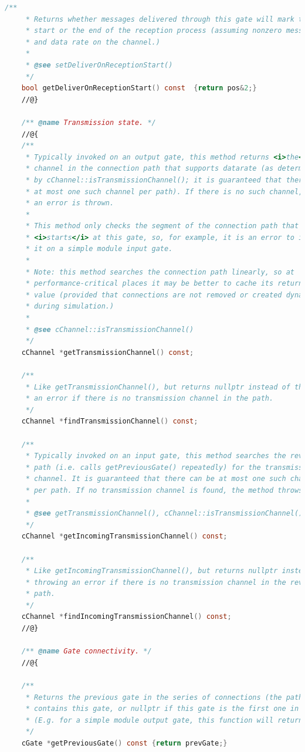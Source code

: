 \begin{lstlisting}[language=c]
    /**
     * Returns whether messages delivered through this gate will mark the
     * start or the end of the reception process (assuming nonzero message length
     * and data rate on the channel.)
     *
     * @see setDeliverOnReceptionStart()
     */
    bool getDeliverOnReceptionStart() const  {return pos&2;}
    //@}

    /** @name Transmission state. */
    //@{
    /**
     * Typically invoked on an output gate, this method returns <i>the</i>
     * channel in the connection path that supports datarate (as determined
     * by cChannel::isTransmissionChannel(); it is guaranteed that there can be
     * at most one such channel per path). If there is no such channel,
     * an error is thrown.
     *
     * This method only checks the segment of the connection path that
     * <i>starts</i> at this gate, so, for example, it is an error to invoke
     * it on a simple module input gate.
     *
     * Note: this method searches the connection path linearly, so at
     * performance-critical places it may be better to cache its return
     * value (provided that connections are not removed or created dynamically
     * during simulation.)
     *
     * @see cChannel::isTransmissionChannel()
     */
    cChannel *getTransmissionChannel() const;

    /**
     * Like getTransmissionChannel(), but returns nullptr instead of throwing
     * an error if there is no transmission channel in the path.
     */
    cChannel *findTransmissionChannel() const;

    /**
     * Typically invoked on an input gate, this method searches the reverse
     * path (i.e. calls getPreviousGate() repeatedly) for the transmission
     * channel. It is guaranteed that there can be at most one such channel
     * per path. If no transmission channel is found, the method throws an error.
     *
     * @see getTransmissionChannel(), cChannel::isTransmissionChannel()
     */
    cChannel *getIncomingTransmissionChannel() const;

    /**
     * Like getIncomingTransmissionChannel(), but returns nullptr instead of
     * throwing an error if there is no transmission channel in the reverse
     * path.
     */
    cChannel *findIncomingTransmissionChannel() const;
    //@}

    /** @name Gate connectivity. */
    //@{

    /**
     * Returns the previous gate in the series of connections (the path) that
     * contains this gate, or nullptr if this gate is the first one in the path.
     * (E.g. for a simple module output gate, this function will return nullptr.)
     */
    cGate *getPreviousGate() const {return prevGate;}


\end{lstlisting}
